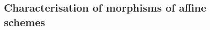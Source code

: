\documentclass[../main.tex]{subfiles}
\begin{document}
\subsection{Characterisation of morphisms of affine schemes}

\end{document}
